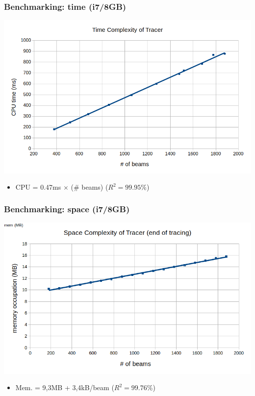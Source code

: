 \documentclass{beamer}
\begin{document}
\begin{frame}
\frametitle{Benchmarking: time (i7/8GB)}

\begin{center}
\includegraphics[scale = .45]{timecomplexity.png}
\end{center}


\begin{itemize}
\item CPU = 0.47ms $\times$ (\# beams) ($R^2 = 99.95$\%)
\end{itemize}

\end{frame}

\begin{frame}
\frametitle{Benchmarking: space (i7/8GB)}

\begin{center}
\includegraphics[scale = .45]{spacecomplexity.png}
\end{center}


\begin{itemize}
\item Mem. = 9,3MB + 3,4kB/beam ($R^2 = 99.76$\%)
\end{itemize}
\end{frame}
\end{document}
